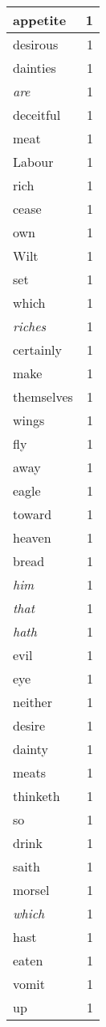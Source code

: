 \begin{center}
\begin{longtable}{l|r}
appetite & 1\\ \hline 
desirous & 1\\ \hline 
dainties & 1\\ \hline 
\emph{are} & 1\\ \hline 
deceitful & 1\\ \hline 
meat & 1\\ \hline 
Labour & 1\\ \hline 
rich & 1\\ \hline 
cease & 1\\ \hline 
own & 1\\ \hline 
Wilt & 1\\ \hline 
set & 1\\ \hline 
which & 1\\ \hline 
\emph{riches} & 1\\ \hline 
certainly & 1\\ \hline 
make & 1\\ \hline 
themselves & 1\\ \hline 
wings & 1\\ \hline 
fly & 1\\ \hline 
away & 1\\ \hline 
eagle & 1\\ \hline 
toward & 1\\ \hline 
heaven & 1\\ \hline 
bread & 1\\ \hline 
\emph{him} & 1\\ \hline 
\emph{that} & 1\\ \hline 
\emph{hath} & 1\\ \hline 
evil & 1\\ \hline 
eye & 1\\ \hline 
neither & 1\\ \hline 
desire & 1\\ \hline 
dainty & 1\\ \hline 
meats & 1\\ \hline 
thinketh & 1\\ \hline 
so & 1\\ \hline 
drink & 1\\ \hline 
saith & 1\\ \hline 
morsel & 1\\ \hline 
\emph{which} & 1\\ \hline 
hast & 1\\ \hline 
eaten & 1\\ \hline 
vomit & 1\\ \hline 
up & 1\\ \hline 

\end{longtable}
\end{center}
